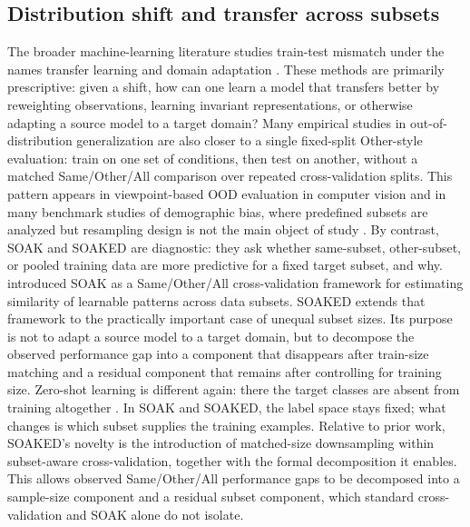 \documentclass{article}
\begin{document}
\subsection{Distribution shift and transfer across subsets}
The broader machine-learning literature studies train-test mismatch under the names transfer learning and domain adaptation \citep{pan2010transfer,Farahani2021}.
These methods are primarily prescriptive: given a shift, how can one learn a model that transfers better by reweighting observations, learning invariant representations, or otherwise adapting a source model to a target domain?
Many empirical studies in out-of-distribution generalization are also closer to a single fixed-split Other-style evaluation: train on one set of conditions, then test on another, without a matched Same/Other/All comparison over repeated cross-validation splits. This pattern appears in viewpoint-based OOD evaluation in computer vision \citep{madan2020and} and in many benchmark studies of demographic bias, where predefined subsets are analyzed but resampling design is not the main object of study \citep{savoldi2021gender,hall2024visogender}.
By contrast, SOAK and SOAKED are diagnostic: they ask whether same-subset, other-subset, or pooled training data are more predictive for a fixed target subset, and why.
\citet{hocking2026} introduced SOAK as a Same/Other/All cross-validation framework for estimating similarity of learnable patterns across data subsets.
SOAKED extends that framework to the practically important case of unequal subset sizes.
Its purpose is not to adapt a source model to a target domain, but to decompose the observed performance gap into a component that disappears after train-size matching and a residual component that remains after controlling for training size.
Zero-shot learning is different again: there the target classes are absent from training altogether \citep{larochelle2008,palatucci2009}. In SOAK and SOAKED, the label space stays fixed; what changes is which subset supplies the training examples.
Relative to prior work, SOAKED's novelty is the introduction of matched-size downsampling within subset-aware cross-validation, together with the formal decomposition it enables.
This allows observed Same/Other/All performance gaps to be decomposed into a sample-size component and a residual subset component, which standard cross-validation and SOAK alone do not isolate.
\end{document}
